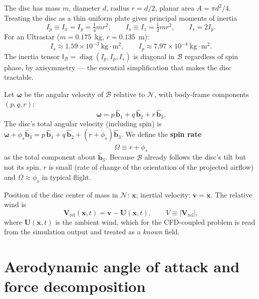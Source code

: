\documentclass[11pt,letterpaper]{article}
\begin{document}
The disc has mass $m$, diameter $d$, radius $r = d/2$, planar area $A = \pi d^2/4$. Treating the disc as a thin uniform plate gives principal moments of inertia
\begin{equation}
I_p \equiv I_x = I_y = \tfrac{1}{4} m r^2, \qquad
I_s \equiv I_z = \tfrac{1}{2} m r^2, \qquad
I_s = 2 I_p.
\label{eq:Idef}
\end{equation}
For an Ultrastar ($m = 0.175$~kg, $r = 0.135$~m):
\begin{equation}
I_s \approx 1.59\times10^{-3}\ \text{kg}\cdot\text{m}^2, \qquad
I_p \approx 7.97\times10^{-4}\ \text{kg}\cdot\text{m}^2.
\label{eq:Inum}
\end{equation}
The inertia tensor $\mathsf{I}_{\mathcal{B}} = \operatorname{diag}(I_p, I_p, I_s)$ is diagonal in $\mathcal{B}$ regardless of spin phase, by axisymmetry --- the essential simplification that makes the disc tractable.

Let $\boldsymbol{\omega}$ be the angular velocity of $\mathcal{B}$ relative to $\mathcal{N}$, with body-frame components $(p, q, r)$:
\begin{equation}
\boldsymbol{\omega} = p\,\hat{\mathbf{b}}_1 + q\,\hat{\mathbf{b}}_2 + r\,\hat{\mathbf{b}}_3.
\label{eq:omegadef}
\end{equation}
The disc's total angular velocity (including spin) is $\boldsymbol{\omega} + \dot{\phi}_s \hat{\mathbf{b}}_3 = p\,\hat{\mathbf{b}}_1 + q\,\hat{\mathbf{b}}_2 + (r + \dot{\phi}_s)\hat{\mathbf{b}}_3$. We define the \textbf{spin rate}
\begin{equation}
\Omega \equiv r + \dot{\phi}_s
\label{eq:Omega}
\end{equation}
as the total component about $\hat{\mathbf{b}}_3$. Because $\mathcal{B}$ already follows the disc's tilt but not its spin, $r$ is small (rate of change of the orientation of the projected airflow) and $\Omega \approx \dot{\phi}_s$ in typical flight.

Position of the disc center of mass in $\mathcal{N}$: $\mathbf{x}$; inertial velocity: $\mathbf{v} = \dot{\mathbf{x}}$. The relative wind is
\begin{equation}
\mathbf{V}_{\text{rel}}(\mathbf{x}, t) = \mathbf{v} - \mathbf{U}(\mathbf{x}, t), \qquad V \equiv |\mathbf{V}_{\text{rel}}|,
\label{eq:Vrel}
\end{equation}
where $\mathbf{U}(\mathbf{x}, t)$ is the ambient wind, which for the CFD-coupled problem is read from the simulation output and treated as a \emph{known} field.

\section{Aerodynamic angle of attack and force decomposition}
\end{document}
